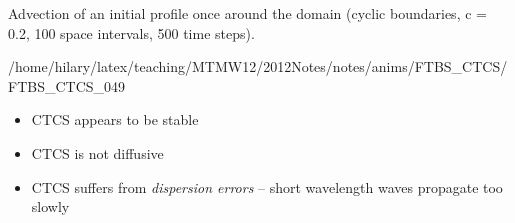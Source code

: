 \clearpage
{}

Advection of an initial profile once around the domain (cyclic boundaries, c = 0.2, 100 space intervals, 500 time steps).

{/home/hilary/latex/teaching/MTMW12/2012Notes/notes/anims/FTBS_CTCS/FTBS_CTCS_}{0}{49}

\begin{itemize}
\item CTCS appears to be stable
\item CTCS is not diffusive
\item CTCS suffers from {\it dispersion errors} -- short wavelength waves propagate too slowly
\end{itemize}

